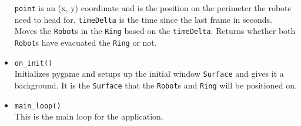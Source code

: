 \documentclass[12pt,letterpaper]{article}
\newcommand{\tableheader}{\rowfont\bf\rowcolor{thcolor!30}}
\begin{document}
\begin{itemize}
                \texttt{point} is an (x, y) coordinate and is the position on the perimeter the robots need to head for. \texttt{timeDelta} is the time since the last frame in seconds. Moves the \texttt{Robot}s in the \texttt{Ring} based on the \texttt{timeDelta}. Returns whether both \texttt{Robot}s have evacuated the \texttt{Ring} or not.
            \item \texttt{on\_init()} \\
                Initializes pygame and setups up the initial window \texttt{Surface} and gives it a background. It is the \texttt{Surface} that the \texttt{Robot}s and \texttt{Ring} will be positioned on.
            \item \texttt{main\_loop()} \\
                This is the main loop for the application.
        \end{itemize}

        
\end{document}
